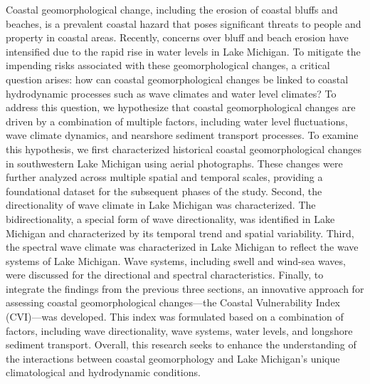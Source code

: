Coastal geomorphological change, including the erosion of coastal bluffs and beaches, is a prevalent coastal hazard that poses significant threats to people and property in coastal areas. Recently, concerns over bluff and beach erosion have intensified due to the rapid rise in water levels in Lake Michigan. To mitigate the impending risks associated with these geomorphological changes, a critical question arises: how can coastal geomorphological changes be linked to coastal hydrodynamic processes such as wave climates and water level climates? To address this question, we hypothesize that coastal geomorphological changes are driven by a combination of multiple factors, including water level fluctuations, wave climate dynamics, and nearshore sediment transport processes. To examine this hypothesis, we first characterized historical coastal geomorphological changes in southwestern Lake Michigan using aerial photographs. These changes were further analyzed across multiple spatial and temporal scales, providing a foundational dataset for the subsequent phases of the study. Second, the directionality of wave climate in Lake Michigan was characterized. The bidirectionality, a special form of wave directionality, was identified in Lake Michigan and characterized by its temporal trend and spatial variability. Third, the spectral wave climate was characterized in Lake Michigan to reflect the wave systems of Lake Michigan. Wave systems, including swell and wind-sea waves, were discussed for the directional and spectral characteristics. Finally, to integrate the findings from the previous three sections, an innovative approach for assessing coastal geomorphological changes—the Coastal Vulnerability Index (CVI)—was developed. This index was formulated based on a combination of factors, including wave directionality, wave systems, water levels, and longshore sediment transport. Overall, this research seeks to enhance the understanding of the interactions between coastal geomorphology and Lake Michigan’s unique climatological and hydrodynamic conditions.